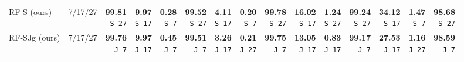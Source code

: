 \documentclass[10pt]{article}
\begin{document}
{\begin{tabular*}{\linewidth}{@{\extracolsep{\fill}}llrrrrrrrrrrrrr}
RF-S (ours) & 7/17/27 & \shortstack{\textbf{99.81}\\{\tiny\texttt{S-27}}} & \shortstack{\textbf{9.97}\\{\tiny\texttt{S-17}}} & \shortstack{\textbf{0.28}\\{\tiny\texttt{S-7}}} & \shortstack{\textbf{99.52}\\{\tiny\texttt{S-27}}} & \shortstack{\textbf{4.11}\\{\tiny\texttt{S-17}}} & \shortstack{\textbf{0.20}\\{\tiny\texttt{S-7}}} & \shortstack{\textbf{99.78}\\{\tiny\texttt{S-27}}} & \shortstack{\textbf{16.02}\\{\tiny\texttt{S-17}}} & \shortstack{\textbf{1.24}\\{\tiny\texttt{S-27}}} & \shortstack{\textbf{99.24}\\{\tiny\texttt{S-27}}} & \shortstack{\textbf{34.12}\\{\tiny\texttt{S-17}}} & \shortstack{\textbf{1.47}\\{\tiny\texttt{S-7}}} & \shortstack{\textbf{98.68}\\{\tiny\texttt{S-27}}}\\
RF-SJg (ours) & 7/17/27 & \shortstack{\textbf{99.76}\\{\tiny\texttt{J-7}}} & \shortstack{\textbf{9.97}\\{\tiny\texttt{J-17}}} & \shortstack{\textbf{0.45}\\{\tiny\texttt{J-7}}} & \shortstack{\textbf{99.51}\\{\tiny\texttt{J-7}}} & \shortstack{\textbf{3.26}\\{\tiny\texttt{J-17}}} & \shortstack{\textbf{0.21}\\{\tiny\texttt{J-27}}} & \shortstack{\textbf{99.75}\\{\tiny\texttt{J-7}}} & \shortstack{\textbf{13.05}\\{\tiny\texttt{J-17}}} & \shortstack{\textbf{0.83}\\{\tiny\texttt{J-17}}} & \shortstack{\textbf{99.17}\\{\tiny\texttt{J-7}}} & \shortstack{\textbf{27.53}\\{\tiny\texttt{J-17}}} & \shortstack{\textbf{1.16}\\{\tiny\texttt{J-27}}} & \shortstack{\textbf{98.59}\\{\tiny\texttt{J-7}}}\\

\end{tabular*}}
\end{document}
